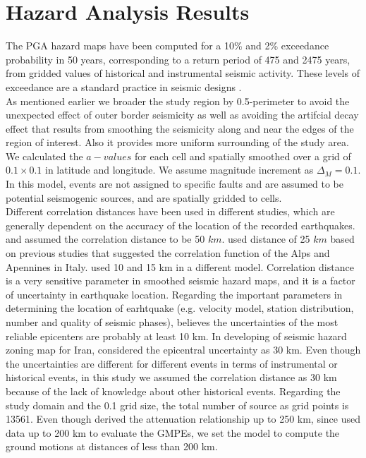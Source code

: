 \section{Hazard Analysis Results}

The PGA hazard maps have been computed for a 10\% and 2\% exceedance probability in 50 years, corresponding to a return period of 475 and 2475 years, from gridded values of historical and instrumental seismic activity. These levels of exceedance are a standard practice in seismic designs \citep{BHRC2014}.\\
\noindent
As mentioned earlier we broader the study region by 0.5\textdegree{}-perimeter to avoid the unexpected effect of outer border seismicity as well as avoiding the artifcial decay effect that results from smoothing the seismicity along and near the edges of the region of interest. Also it provides more uniform surrounding of the study area\citep{Lapajne1997}.
\noindent
We calculated the $a-values$ for each cell and spatially smoothed over a grid of $0.1 \times 0.1$ in latitude and longitude. We assume magnitude increment as $\Delta_M = 0.1$. In this model, events are not assigned to specific faults and are assumed to be potential seismogenic sources, and are spatially gridded to cells. \\
\noindent
Different correlation distances have been used in different studies, which are generally dependent on the accuracy of the location of the recorded earthquakes. \citet{Frankel1995} and \citet{Boyd2008} assumed the correlation distance to be 50 $km$. \citet{Barani2007} used distance of 25 $km$ based on previous studies that suggested the correlation function of the Alps and Apennines in Italy. \citet{Foteva2006} used 10 and 15 km in a different model. Correlation distance is a very sensitive parameter in smoothed seismic hazard maps, and it is a factor of uncertainty in earthquake location.
Regarding the important parameters in determining the location of earhtquake (e.g. velocity model, station distribution, number and quality of seismic phases),\citet{Mirzaei1997} believes the uncertainties of the most reliable epicenters are probably at least 10 km. In developing of seismic hazard zoning map for Iran,\citet{Zare2012} considered the epicentral uncertainty as 30 km. Even though the uncertainties are different for different events in terms of instrumental or historical events, in this study we assumed the correlation distance as 30 km because of the lack of knowledge about other historical events. Regarding the study domain and the 0.1 grid size, the total number of source as grid points is 13561. Even though \citet{Kalkan2004} derived the attenuation relationship up to 250 km, since \citet{Zafarani2014} used data up to 200 km to evaluate the GMPEs, we set the model to compute the ground motions at distances of less than 200 km.


